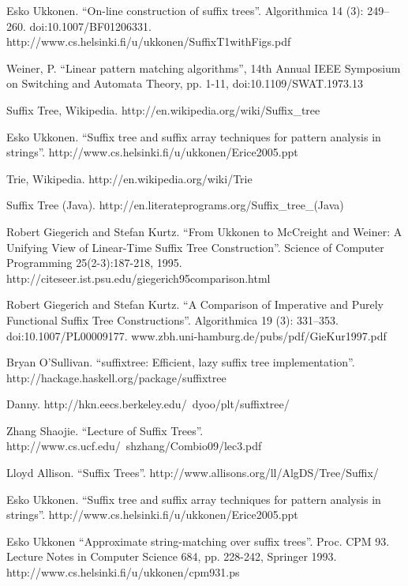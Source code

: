 \documentclass{article}
\begin{document}
\begin{thebibliography}{99}

Esko Ukkonen. ``On-line construction of suffix trees''. Algorithmica 14 (3): 249--260. doi:10.1007/BF01206331. http://www.cs.helsinki.fi/u/ukkonen/SuffixT1withFigs.pdf

Weiner, P. ``Linear pattern matching algorithms'', 14th Annual IEEE Symposium on Switching and Automata Theory, pp. 1-11, doi:10.1109/SWAT.1973.13

Suffix Tree, Wikipedia. http://en.wikipedia.org/wiki/Suffix\_tree

Esko Ukkonen. ``Suffix tree and suffix array techniques for pattern analysis in strings''. http://www.cs.helsinki.fi/u/ukkonen/Erice2005.ppt

Trie, Wikipedia. http://en.wikipedia.org/wiki/Trie

Suffix Tree (Java). http://en.literateprograms.org/Suffix\_tree\_(Java)

Robert Giegerich and Stefan Kurtz. ``From Ukkonen to McCreight and Weiner: A Unifying View of Linear-Time Suffix Tree Construction''. Science of Computer Programming 25(2-3):187-218, 1995. http://citeseer.ist.psu.edu/giegerich95comparison.html

Robert Giegerich and Stefan Kurtz. ``A Comparison of Imperative and Purely Functional Suffix Tree Constructions''. Algorithmica 19 (3): 331--353. doi:10.1007/PL00009177. www.zbh.uni-hamburg.de/pubs/pdf/GieKur1997.pdf

Bryan O'Sullivan. ``suffixtree: Efficient, lazy suffix tree implementation''. http://hackage.haskell.org/package/suffixtree

Danny. http://hkn.eecs.berkeley.edu/~dyoo/plt/suffixtree/

Zhang Shaojie. ``Lecture of Suffix Trees''. http://www.cs.ucf.edu/~shzhang/Combio09/lec3.pdf

Lloyd Allison. ``Suffix Trees''. http://www.allisons.org/ll/AlgDS/Tree/Suffix/

Esko Ukkonen. ``Suffix tree and suffix array techniques for pattern analysis in strings''. http://www.cs.helsinki.fi/u/ukkonen/Erice2005.ppt

Esko Ukkonen ``Approximate string-matching over suffix trees''. Proc. CPM 93. Lecture Notes in Computer Science 684, pp. 228-242, Springer 1993. http://www.cs.helsinki.fi/u/ukkonen/cpm931.ps

\end{thebibliography}

\ifx\wholebook\relax \else
\end{document}
